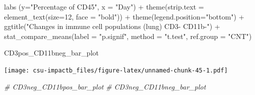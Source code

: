 \documentclass[
]{book}
\newenvironment{Shaded}{\begin{snugshade}}{\end{snugshade}}
\newcommand{\AttributeTok}[1]{\textcolor[rgb]{0.77,0.63,0.00}{#1}}
\newcommand{\CommentTok}[1]{\textcolor[rgb]{0.56,0.35,0.01}{\textit{#1}}}
\newcommand{\DecValTok}[1]{\textcolor[rgb]{0.00,0.00,0.81}{#1}}
\newcommand{\FunctionTok}[1]{\textcolor[rgb]{0.00,0.00,0.00}{#1}}
\newcommand{\NormalTok}[1]{#1}
\newcommand{\SpecialCharTok}[1]{\textcolor[rgb]{0.00,0.00,0.00}{#1}}
\newcommand{\StringTok}[1]{\textcolor[rgb]{0.31,0.60,0.02}{#1}}
\begin{document}
\begin{Shaded}
\begin{Highlighting}[]
  \FunctionTok{labs}\NormalTok{ (}\AttributeTok{y=}\StringTok{"Percentage of CD45"}\NormalTok{, }\AttributeTok{x =} \StringTok{"Day"}\NormalTok{) }\SpecialCharTok{+} 
  \FunctionTok{theme}\NormalTok{(}\AttributeTok{strip.text =} \FunctionTok{element\_text}\NormalTok{(}\AttributeTok{size=}\DecValTok{12}\NormalTok{, }\AttributeTok{face =} \StringTok{"bold"}\NormalTok{)) }\SpecialCharTok{+} \FunctionTok{theme}\NormalTok{(}\AttributeTok{legend.position=}\StringTok{"bottom"}\NormalTok{) }\SpecialCharTok{+}
  \FunctionTok{ggtitle}\NormalTok{(}\StringTok{"Changes in immune cell populations (lung) CD3{-} CD11b{-}"}\NormalTok{) }\SpecialCharTok{+}
  \FunctionTok{stat\_compare\_means}\NormalTok{(}\AttributeTok{label =} \StringTok{"p.signif"}\NormalTok{, }\AttributeTok{method =} \StringTok{"t.test"}\NormalTok{,}
                     \AttributeTok{ref.group =} \StringTok{"CNT"}\NormalTok{)}

\NormalTok{CD3pos\_CD11bneg\_bar\_plot}
\end{Highlighting}
\end{Shaded}

\texttt{[image: csu-impactb\_files/figure-latex/unnamed-chunk-45-1.pdf]}

\begin{Shaded}
\begin{Highlighting}[]
\CommentTok{\# CD3neg\_CD11bpos\_bar\_plot}
\CommentTok{\# CD3neg\_CD11bneg\_bar\_plot}
\end{Highlighting}
\end{Shaded}


  
\end{document}
